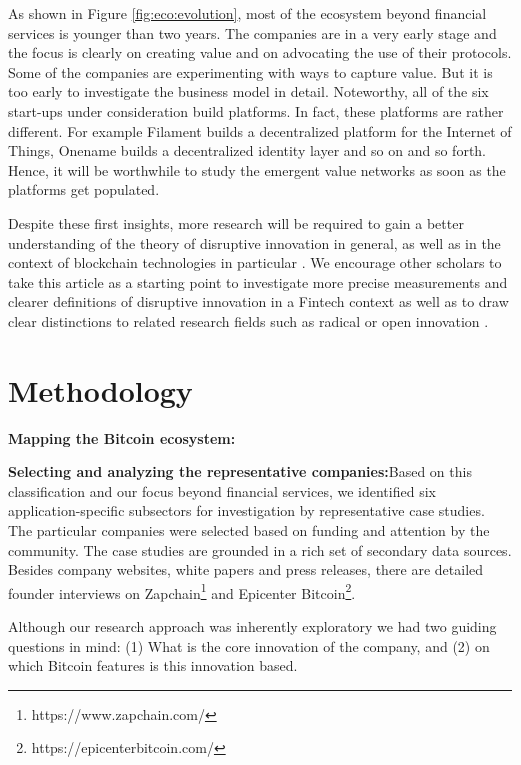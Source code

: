 As shown in Figure \ref{fig:eco:evolution}, most of the ecosystem beyond financial services is younger 
than two years. The companies are in a very early stage and the focus is clearly 
on creating value and on advocating the use of their protocols. Some of the companies 
are experimenting with ways to capture value. But it is too early to investigate 
the business model in detail. Noteworthy, all of the six start-ups under consideration 
build platforms. In fact, these platforms are rather different. For example Filament 
builds a decentralized platform for the Internet of Things, Onename builds a decentralized 
identity layer and so on and so forth. Hence, it will be worthwhile to study the 
emergent value networks as soon as the platforms get populated.

Despite these first insights, more research will be required to gain a better understanding 
of the theory of disruptive innovation in general, as well as in the context of 
blockchain technologies in particular \parencite[cf.]{ISI:000222662900002}. We encourage other 
scholars to take this article as a starting point to investigate more precise measurements 
\parencite[cf.]{JPIM:JPIM176} and clearer definitions \parencite{JPIM:JPIM177} 
of disruptive innovation in a Fintech context as well as to draw clear distinctions 
to related research fields such as radical or open innovation \parencite[cf.]{ISI:000283729100005}. 


\section{Methodology}
\label{sec:eco:method}

\textbf{Mapping the Bitcoin ecosystem:} 

\textbf{Selecting and analyzing the representative companies:}Based on this classification 
and our focus beyond financial services, we identified six application-specific 
subsectors for investigation by representative case studies. The particular companies 
were selected based on funding and attention by the community. The case studies 
are grounded in a rich set of secondary data sources. Besides company websites, 
white papers and press releases, there are detailed founder interviews on Zapchain\footnote{https://www.zapchain.com/} and Epicenter Bitcoin\footnote{https://epicenterbitcoin.com/}. 

Although our research approach was inherently exploratory we had two guiding questions 
in mind: (1) What is the core innovation of the company, and (2) on which Bitcoin 
features is this innovation based.


